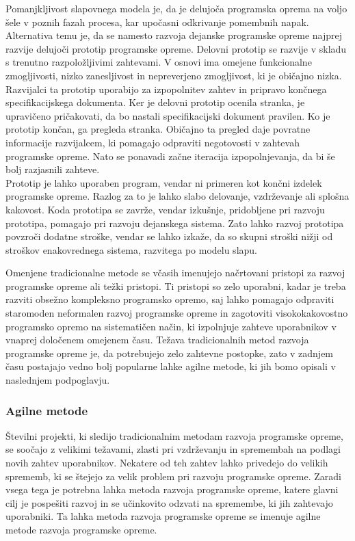 \documentclass[a4paper,12pt,openright]{book}
\begin{document}
Pomanjkljivost slapovnega modela je, da je delujoča programska oprema na voljo šele v poznih fazah procesa, kar upočasni odkrivanje pomembnih napak. Alternativa temu je, da se namesto razvoja dejanske programske opreme najprej razvije delujoči prototip programske opreme. Delovni prototip se razvije v skladu s trenutno razpoložljivimi zahtevami. V osnovi ima omejene funkcionalne zmogljivosti, nizko zanesljivost in nepreverjeno zmogljivost, ki je običajno nizka. \\
Razvijalci ta prototip uporabijo za izpopolnitev zahtev in pripravo končnega specifikacijskega dokumenta. Ker je delovni prototip ocenila stranka, je upravičeno pričakovati, da bo nastali specifikacijski dokument pravilen. Ko je prototip končan, ga pregleda stranka. Običajno ta pregled daje povratne informacije razvijalcem, ki pomagajo odpraviti negotovosti v zahtevah programske opreme. Nato se ponavadi začne iteracija izpopolnjevanja, da bi še bolj razjasnili zahteve. \\
Prototip je lahko uporaben program, vendar ni primeren kot končni izdelek programske opreme. Razlog za to je lahko slabo delovanje, vzdrževanje ali splošna kakovost. Koda prototipa se zavrže, vendar izkušnje, pridobljene pri razvoju prototipa, pomagajo pri razvoju dejanskega sistema. Zato lahko razvoj prototipa povzroči dodatne stroške, vendar se lahko izkaže, da so skupni stroški nižji od stroškov enakovrednega sistema, razvitega po modelu slapu. \cite{aggarwal2005software}

Omenjene tradicionalne metode se včasih imenujejo načrtovani pristopi za razvoj programske opreme ali težki pristopi. Ti pristopi so zelo uporabni, kadar je treba razviti obsežno kompleksno programsko opremo, saj lahko pomagajo odpraviti staromoden neformalen razvoj programske opreme in zagotoviti visokokakovostno programsko opremo na sistematičen način, ki izpolnjuje zahteve uporabnikov v vnaprej določenem omejenem času. Težava tradicionalnih metod razvoja programske opreme je, da potrebujejo zelo zahtevne postopke, zato v zadnjem času postajajo vedno bolj popularne lahke agilne metode, ki jih bomo opisali v naslednjem podpoglavju.


\subsubsection{Agilne metode}
\sloppy
Številni projekti, ki sledijo tradicionalnim metodam razvoja programske opreme, se soočajo z velikimi težavami, zlasti pri vzdrževanju in spremembah na podlagi novih zahtev uporabnikov. Nekatere od teh zahtev lahko privedejo do velikih sprememb, ki se štejejo za velik problem pri razvoju programske opreme.  Zaradi vsega tega je potrebna lahka metoda razvoja programske opreme, katere glavni cilj je pospešiti razvoj in se učinkovito odzvati na spremembe, ki jih zahtevajo uporabniki. Ta lahka metoda razvoja programske opreme se imenuje agilne metode razvoja programske opreme. 
\cite{AlSaqqa2020AgileSD}
\end{document}
